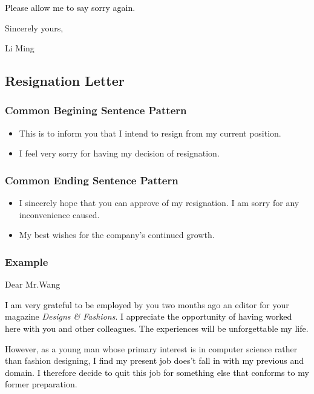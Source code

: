 \documentclass{article}
\begin{document}
\par \textcolor{black}{Please allow me to say sorry again}.

\hfill Sincerely yours,

\hfill Li Ming



\subsection{Resignation Letter}
\label{sec:letter}

\subsubsection{Common Begining Sentence Pattern}
\label{sec:comm-begnn-sent}
\begin{itemize}
\item This is to inform you that I intend to resign from my current position.
\item I feel very sorry for having my decision of resignation.
\end{itemize}

\subsubsection{Common Ending Sentence Pattern}
\label{sec:comm-ending-sent-2}
\begin{itemize}
\item I sincerely hope that you can approve of my resignation. I am sorry for any
  inconvenience caused.
\item My best wishes for the company's continued growth.
\end{itemize}

\subsubsection{Example}
\label{sec:example-2}
Dear Mr.Wang
\par \textcolor{black}{I am very grateful to be employed }by you two months ago an editor
for your magazine \emph {Designs \& Fashions}. \textcolor{black}{I appreciate the opportunity
of having worked here with you and other colleagues. The experiences will be
unforgettable my life}.

\par \textcolor{black}{However}, as a young man whose primary interest is in computer
science rather than fashion designing, \textcolor{black}{I find my present job does't fall
  in with my previous and domain. I therefore decide to quit this job for something else
  that conforms to my former preparation}.
\end{document}
